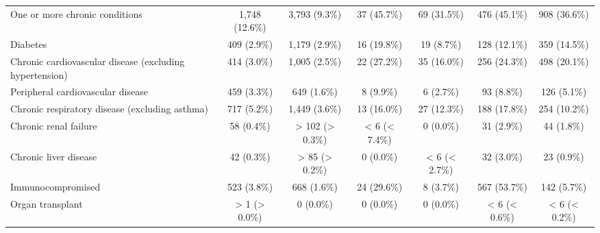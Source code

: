 \documentclass{article}
\begin{document}
\begin{table}[htbp]
\begin{tabular}{l*{6}{c}}
One or more chronic conditions                          &          1,748 (12.6\%)         &          3,793 (9.3\%)          &           37 (45.7\%)           &           69 (31.5\%)           &           476 (45.1\%)          &           908 (36.6\%)          \\
Diabetes                                                &           409 (2.9\%)           &          1,179 (2.9\%)          &           16 (19.8\%)           &            19 (8.7\%)           &           128 (12.1\%)          &           359 (14.5\%)          \\
Chronic cardiovascular disease (excluding hypertension) &           414 (3.0\%)           &          1,005 (2.5\%)          &           22 (27.2\%)           &           35 (16.0\%)           &           256 (24.3\%)          &           498 (20.1\%)          \\
Peripheral cardiovascular disease                       &           459 (3.3\%)           &           649 (1.6\%)           &            8 (9.9\%)            &            6 (2.7\%)            &            93 (8.8\%)           &           126 (5.1\%)           \\
Chronic respiratory disease (excluding asthma)          &           717 (5.2\%)           &          1,449 (3.6\%)          &           13 (16.0\%)           &           27 (12.3\%)           &           188 (17.8\%)          &           254 (10.2\%)          \\
Chronic renal failure                                   &            58 (0.4\%)           &         > 102 (> 0.3\%)         &          < 6 (< 7.4\%)          &            0 (0.0\%)            &            31 (2.9\%)           &            44 (1.8\%)           \\
Chronic liver disease                                   &            42 (0.3\%)           &          > 85 (> 0.2\%)         &            0 (0.0\%)            &          < 6 (< 2.7\%)          &            32 (3.0\%)           &            23 (0.9\%)           \\
Immunocompromised                                       &           523 (3.8\%)           &           668 (1.6\%)           &           24 (29.6\%)           &            8 (3.7\%)            &           567 (53.7\%)          &           142 (5.7\%)           \\
Organ transplant                                        &          > 1 (> 0.0\%)          &            0 (0.0\%)            &            0 (0.0\%)            &            0 (0.0\%)            &          < 6 (< 0.6\%)          &          < 6 (< 0.2\%)          \\

\end{tabular}
\end{table}
\end{document}
